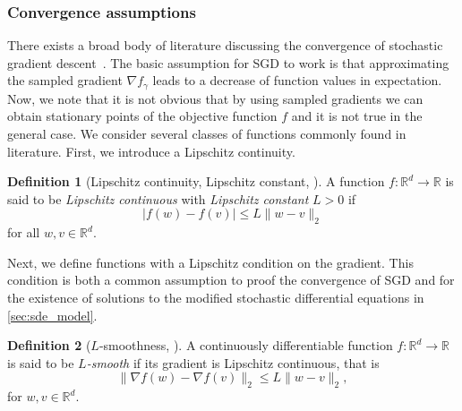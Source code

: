 \documentclass[12pt]{article}
\theoremstyle{definition}
\newtheorem{definition}[definition]{Definition}
\numberwithin{equation}{section}
\newcommand{\R}{\mathbb{R}}
\newcommand{\norm}[1]{\lVert{#1}\rVert_2}
\begin{document}
\subsubsection{Convergence assumptions}
There exists a broad body of literature discussing the convergence of stochastic gradient descent~\cite{allen-zhuConvergenceTheoryDeep2019,mertikopoulosAlmostSureConvergence2020,vaswaniFastFasterConvergence2019,gowerSGDGeneralAnalysis2019,liConvergenceStochasticGradient2019,sebbouhAlmostSureConvergence2021,bottouOptimizationMethodsLargeScale2018}.
The basic assumption for SGD to work is that approximating the sampled gradient $\nabla f_{\gamma}$ leads to a decrease of function values in expectation. Now, we note that it is not obvious that by using sampled gradients we can obtain stationary points of the objective function $f$ and it is not true in the general case. We consider several classes of functions commonly found in literature.
First, we introduce a Lipschitz continuity. 
\begin{definition}[Lipschitz continuity, Lipschitz constant, ]
  \label{def:lipschitz_continuity}
  A function $f : \R^d \rightarrow \R$ is said to be \emph{Lipschitz continuous} with \emph{Lipschitz constant} $L >0$ if
  \begin{equation*}
    |f(w) - f(v)| \leq L \norm{w - v}
  \end{equation*}
  for all $w,v \in \R^d$.
\end{definition}
Next, we define functions with a Lipschitz condition on the gradient. This condition is both a common assumption to proof the convergence of SGD and for the existence of solutions to the modified stochastic differential equations in \autoref{sec:sde_model}.
\begin{definition}[$L$-smoothness, ]
  \label{def:l_smooth}
  A continuously differentiable function $f : \R^d \rightarrow \R$ is said to be \emph{$L$-smooth} if its gradient is Lipschitz continuous, that is 
  \begin{equation*}
    \norm{\nabla f(w) - \nabla f(v) } \leq L \norm{w-v},
  \end{equation*}
  for $w,v \in \R^d$.
\end{definition}
\end{document}
